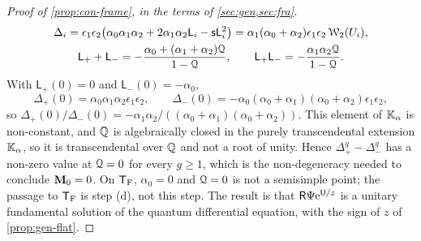 \begin{proof}[Proof of \cref{prop:con-frame}, in the terms of \cref{sec:gen,sec:fra}]
\begin{equation}
\label{eq:con-Delta}
\begin{gathered}
\Delta_i=\epsilon_1\epsilon_2\big(\alpha_0\alpha_1\alpha_2+2\alpha_1\alpha_2\mathsf{L}_i-\mathsf{s}\mathsf{L}_i^2\big)=\alpha_1(\alpha_0+\alpha_2)\epsilon_1\epsilon_2\,\mathcal{W}_2(U_i),\\
\mathsf{L}_++\mathsf{L}_-=-\frac{\alpha_0+(\alpha_1+\alpha_2)\mathcal{Q}}{1-\mathcal{Q}},\qquad \mathsf{L}_+\mathsf{L}_-=-\frac{\alpha_1\alpha_2\mathcal{Q}}{1-\mathcal{Q}}.
\end{gathered}
\end{equation}
With $\mathsf{L}_+(0)=0$ and $\mathsf{L}_-(0)=-\alpha_0$,
\[
\Delta_+(0)=\alpha_0\alpha_1\alpha_2\epsilon_1\epsilon_2,\qquad
\Delta_-(0)=-\alpha_0(\alpha_0+\alpha_1)(\alpha_0+\alpha_2)\epsilon_1\epsilon_2,
\]
so $\Delta_+(0)/\Delta_-(0)=-\alpha_1\alpha_2/((\alpha_0+\alpha_1)(\alpha_0+\alpha_2))$. This element of $\mathbb{K}_{\alpha}$ is non-constant, and $\mathbb{Q}$ is algebraically closed in the purely transcendental extension $\mathbb{K}_{\alpha}$, so it is transcendental over $\mathbb{Q}$ and not a root of unity. Hence $\Delta_+^g-\Delta_-^g$ has a non-zero value at $\mathcal{Q}=0$ for every $g\geq 1$, which is the non-degeneracy needed to conclude $\mathbf{M}_0=0$. On $\mathsf{T}_{\mathrm{F}}$, $\alpha_0=0$ and $\mathcal{Q}=0$ is not a semisimple point; the passage to $\mathsf{T}_{\mathrm{F}}$ is step (d), not this step. The result is that $\mathsf{R}\Psi\mathrm{e}^{\mathsf{U}/z}$ is a unitary fundamental solution of the quantum differential equation, with the sign of $z$ of \cref{prop:gen-flat}.


\end{proof}
